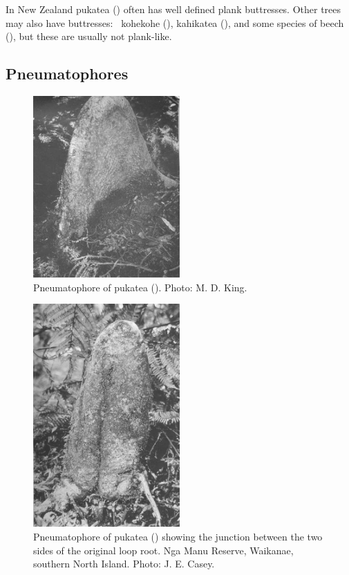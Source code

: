 In New Zealand pukatea () often has well defined plank buttresses.
Other trees may also have buttresses: \eg\ kohekohe (), kahikatea (), and some species of beech (), but these are usually not plank-like.

\subsection{Pneumatophores}

\begin{figure}
	\includegraphics[width=0.5\textwidth]{graphics/figure10pukatea.jpg}
	\centering
	\caption[Pneumatophore of pukatea]{Pneumatophore of pukatea ().
	Photo:  M. D. King.}%
	\label{fig:10pukatea}
\end{figure}

\begin{figure}
	\includegraphics[width=0.5\textwidth]{graphics/figure11pukatea.jpg}
	\centering
	\caption[Pneumatophore of pukatea showing the junction between the two sides of the original loop root]{Pneumatophore of pukatea () showing the junction between the two sides of the original loop root.
	Nga Manu Reserve, Waikanae, southern North Island.
	Photo:  J. E. Casey.}%
	\label{fig:11pukatea}
\end{figure}


